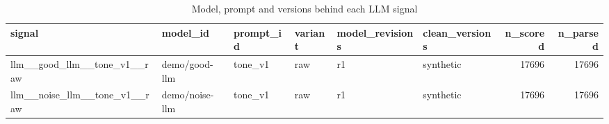 \begin{table}
\caption{Model, prompt and versions behind each LLM signal}
\label{tab:llm_signal_provenance}
\begin{tabular}{llllllrr}
\toprule
signal & model\_id & prompt\_id & variant & model\_revisions & clean\_versions & n\_scored & n\_parsed \\
\midrule
llm\_\_good\_llm\_\_tone\_v1\_\_raw & demo/good-llm & tone\_v1 & raw & r1 & synthetic & 17696 & 17696 \\
llm\_\_noise\_llm\_\_tone\_v1\_\_raw & demo/noise-llm & tone\_v1 & raw & r1 & synthetic & 17696 & 17696 \\
\bottomrule
\end{tabular}
\end{table}
